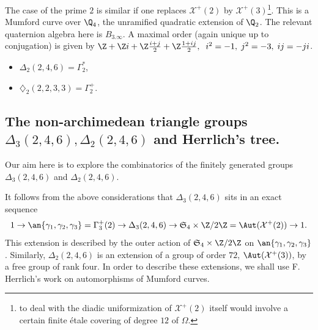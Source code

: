 \begin{para}\label{para::6.3.3} The case of the prime $2$ is similar if one
 replaces $\mathcal{X}^+(2)$ by $\mathcal{X}^+(3)$\footnote{to deal with
 the diadic uniformization of $\mathcal{X}^+(2)$ itself would involve a
 certain finite \'etale covering of degree $12$ of $\Omega$.}. This is a
 Mumford curve over $\Q_4$, the unramified quadratic extension of
 $\Q_2$. The relevant quaternion algebra here is $B_{3.\infty}$. A
 maximal order (again unique up to conjugation) is given by $\Z+\Z i+\Z
 \frac{i+j}{2}+\Z \frac{1+ij}{2},\;\;i^2=-1,\;j^2=-3,\;ij=-ji$.
 
\begin{itemize}
 \item $\Delta_2(2,4,6)=\Gamma_2^\ast$, 
 \item $\diamondsuit_2 (2,2,3,3)=\Gamma_2^+$.
\end{itemize}

\end{para}

\subsection{The non-archimedean triangle groups $\Delta_3(2,4,6),
\Delta_2(2,4,6)$ and Herrlich's tree.}\label{sub::6.4}

\begin{para}\label{para::6.4.1} Our aim here is to explore the combinatorics
 of the finitely  
 generated groups $\Delta_3(2,4,6)$ and $ \Delta_2(2,4,6)$. 

\noindent It follows from the above considerations that
 $\Delta_3(2,4,6)$ sits in an exact sequence 
\begin{equation*}
1\to \an{\gamma_1,\gamma_2,\gamma_3}=\Gamma_3^+(2)\to \Delta_3(2,4,6)\to
 \mathfrak{S}_4\times \Z/2\Z =\Aut(\mathcal{X}^+(2))\to 1.
\end{equation*} 
 \noindent This extension is described by the outer action of
 $\mathfrak{S}_4\times \Z/2\Z$ on  $\an{\gamma_1,\gamma_2,\gamma_3}$. 
 Similarly, $\Delta_2(2,4,6)$ is an extension of a group of order $72$,
 $\Aut(\mathcal{X}^+(3))$, by a free group of rank four. In order to
 describe these extensions, we shall use F. Herrlich's work on 
 automorphisms of Mumford curves. 
\end{para}

